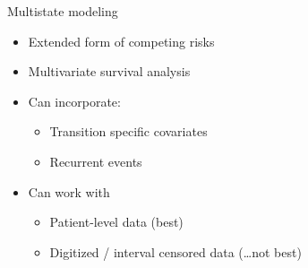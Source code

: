 \documentclass[
  ignorenonframetext,
]{beamer}
\providecommand{\tightlist}{%
  \setlength{\itemsep}{0pt}\setlength{\parskip}{0pt}}
\begin{document}
\begin{frame}{Multistate modeling}
\protect\hypertarget{multistate-modeling-1}{}

\begin{itemize}
\tightlist
\item
  Extended form of competing risks
\item
  Multivariate survival analysis
\item
  Can incorporate:

  \begin{itemize}
  \tightlist
  \item
    Transition specific covariates
  \item
    Recurrent events
  \end{itemize}
\item
  Can work with

  \begin{itemize}
  \tightlist
  \item
    Patient-level data (best)
  \item
    Digitized / interval censored data (\ldots not best)
  \end{itemize}
\end{itemize}

\end{frame}
\end{document}
